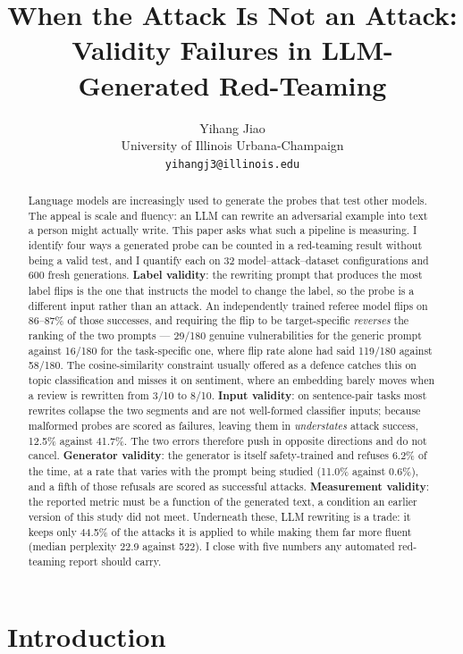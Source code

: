 \documentclass[11pt]{article}
\title{When the Attack Is Not an Attack:\\
Validity Failures in LLM-Generated Red-Teaming}
\author{Yihang Jiao \\
  University of Illinois Urbana-Champaign \\
  \texttt{yihangj3@illinois.edu}}
\date{}
\begin{document}
\maketitle

\begin{abstract}
Language models are increasingly used to generate the probes that test other
models. The appeal is scale and fluency: an LLM can rewrite an adversarial
example into text a person might actually write. This paper asks what such a
pipeline is measuring. I identify four ways a generated probe can be counted in
a red-teaming result without being a valid test, and I quantify each on 32
model--attack--dataset configurations and 600 fresh generations. \textbf{Label
validity}: the rewriting prompt that produces the most label flips is the one
that instructs the model to change the label, so the probe is a different input
rather than an attack. An independently trained referee model flips on 86--87\% of
those successes, and requiring the flip to be target-specific \emph{reverses} the
ranking of the two prompts --- 29/180 genuine vulnerabilities for the generic
prompt against 16/180 for the task-specific one, where flip rate alone had said
119/180 against 58/180. The cosine-similarity constraint usually offered as a
defence catches this on topic classification and misses it on sentiment, where an
embedding barely moves when a review is rewritten from 3/10 to 8/10.
\textbf{Input validity}: on sentence-pair tasks most rewrites collapse the two
segments and are not well-formed classifier inputs; because malformed probes are
scored as failures, leaving them in \emph{understates} attack success, 12.5\%
against 41.7\%. The two errors therefore push in opposite directions and do not
cancel. \textbf{Generator validity}: the generator is itself safety-trained and refuses
6.2\% of the time, at a rate that varies with the prompt being studied (11.0\%
against 0.6\%), and a fifth of those refusals are scored as successful attacks.
\textbf{Measurement validity}: the reported metric must be a function of the
generated text, a condition an earlier version of this study did not meet.
Underneath these, LLM rewriting is a trade: it keeps only 44.5\% of the attacks
it is applied to while making them far more fluent (median perplexity 22.9
against 522). I close with five numbers any automated red-teaming report should carry.
\end{abstract}

\section{Introduction}
\end{document}
